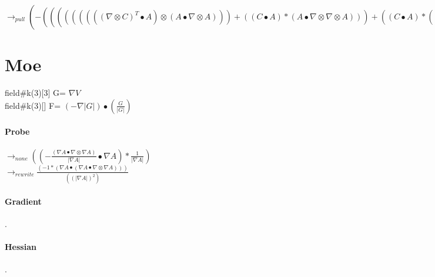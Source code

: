 \documentclass{article}
\begin{document}
\newline $\rightarrow_{pull}(-{((((((((( \nabla  \otimes C)^T \bullet A) \otimes (A \bullet  \nabla  \otimes A)))+((C \bullet A)*(A \bullet  \nabla  \otimes  \nabla  \otimes A)))+((C \bullet A)*(( \nabla  \otimes A)^T \bullet  \nabla  \otimes A)))+((((( \nabla  \otimes C)^T \bullet A)*(A \bullet  \nabla  \otimes A))))^T)+((((C \bullet  \nabla  \otimes A)*(A \bullet  \nabla  \otimes A))))^T)+(((C \bullet  \nabla  \otimes A) \otimes (A \bullet  \nabla  \otimes A))))}* \frac{1}{(|C|*|A|*(A \bullet A))}+((C \bullet A)*((C \bullet  \nabla  \otimes C) \otimes (C \bullet  \nabla  \otimes C)))* \frac{1}{(|C|*|A|*((C \bullet C))^2)}+((((Trav( \nabla  \otimes  \nabla  \otimes C)<2,0,1> \bullet A)+(( \nabla  \otimes C)^T \bullet  \nabla  \otimes A))+(Trav( \nabla  \otimes  \nabla  \otimes A)<2,0,1> \bullet C))+(( \nabla  \otimes A)^T \bullet  \nabla  \otimes C))* \frac{1}{(|C|*|A|)}+-{((|C|*(C \bullet A)*(( \nabla  \otimes C)^T \bullet  \nabla  \otimes C))+(|C|*(C \bullet A)*(C \bullet  \nabla  \otimes  \nabla  \otimes C)))}* \frac{1}{(|A|*(C \bullet C)*(C \bullet C))}+-{((((( \nabla  \otimes A)^T \bullet C) \otimes (C \bullet  \nabla  \otimes C)))+((((C \bullet  \nabla  \otimes A)*(C \bullet  \nabla  \otimes C))))^T+(((( \nabla  \otimes C)^T \bullet A) \otimes (C \bullet  \nabla  \otimes C)))+((((( \nabla  \otimes C)^T \bullet A)*(C \bullet  \nabla  \otimes C))))^T)}* \frac{1}{(|A|*|C|*(C \bullet C))}+(2*|C|*(C \bullet A)*((C \bullet  \nabla  \otimes C) \otimes (C \bullet  \nabla  \otimes C)))* \frac{1}{(|A|*(C \bullet C)*((C \bullet C))^2)}+(((C \bullet A)*((A \bullet  \nabla  \otimes A) \otimes (C \bullet  \nabla  \otimes C)))+(((C \bullet A)*((A \bullet  \nabla  \otimes A)*(C \bullet  \nabla  \otimes C))))^T)* \frac{1}{((C \bullet C)*|A|*|C|*(A \bullet A))}+(((C \bullet A)*((A \bullet  \nabla  \otimes A) \otimes (A \bullet  \nabla  \otimes A)))+(2*(C \bullet A)*((A \bullet  \nabla  \otimes A) \otimes (A \bullet  \nabla  \otimes A))))* \frac{1}{(|A|*|C|*((A \bullet A))^2)})$


\newpage
 \section{Moe}
   field\#k(3)[3] G= $\nabla V$\\
 field\#k(3)[] F= $(-\nabla|G|)\bullet(\frac{G}{|G|})$
\paragraph{Probe} 
$\rightarrow_{none} ((-{ \frac{( \nabla A \bullet  \nabla  \otimes  \nabla A)}{| \nabla A|}} \bullet  \nabla A)* \frac{1}{| \nabla A|})$
 \\ \newline $\rightarrow_{rewrite} \frac{(-1*( \nabla A \bullet ( \nabla A \bullet  \nabla  \otimes  \nabla A)))}{((| \nabla A|)^2)}$
 \paragraph{Gradient}.\\




\paragraph{Hessian}.\\

\newpage
\end{document}
